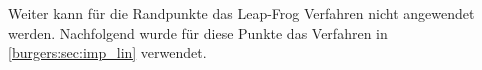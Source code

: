 	Weiter kann f\"ur die Randpunkte das Leap-Frog Verfahren nicht angewendet werden.
	Nachfolgend wurde f\"ur diese Punkte das Verfahren in \autoref{burgers:sec:imp_lin} verwendet.


